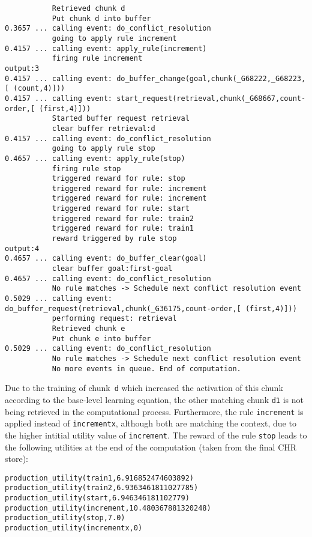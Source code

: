 \begin{lstlisting}
           Retrieved chunk d
           Put chunk d into buffer
0.3657 ... calling event: do_conflict_resolution
           going to apply rule increment
0.4157 ... calling event: apply_rule(increment)
           firing rule increment
output:3
0.4157 ... calling event: do_buffer_change(goal,chunk(_G68222,_G68223,[ (count,4)]))
0.4157 ... calling event: start_request(retrieval,chunk(_G68667,count-order,[ (first,4)]))
           Started buffer request retrieval
           clear buffer retrieval:d
0.4157 ... calling event: do_conflict_resolution
           going to apply rule stop
0.4657 ... calling event: apply_rule(stop)
           firing rule stop
           triggered reward for rule: stop
           triggered reward for rule: increment
           triggered reward for rule: increment
           triggered reward for rule: start
           triggered reward for rule: train2
           triggered reward for rule: train1
           reward triggered by rule stop
output:4
0.4657 ... calling event: do_buffer_clear(goal)
           clear buffer goal:first-goal
0.4657 ... calling event: do_conflict_resolution
           No rule matches -> Schedule next conflict resolution event
0.5029 ... calling event: do_buffer_request(retrieval,chunk(_G36175,count-order,[ (first,4)]))
           performing request: retrieval
           Retrieved chunk e
           Put chunk e into buffer
0.5029 ... calling event: do_conflict_resolution
           No rule matches -> Schedule next conflict resolution event
           No more events in queue. End of computation.
\end{lstlisting}
\flushbottom

Due to the training of chunk~\lstinline|d| which increased the activation of this chunk according to the base-level learning equation, the other matching chunk \lstinline|d1| is not being retrieved in the computational process. Furthermore, the rule \lstinline|increment| is applied instead of \lstinline|incrementx|, although both are matching the context, due to the higher intitial utility value of \lstinline|increment|. The reward of the rule \lstinline|stop| leads to the following utilities at the end of the computation (taken from the final CHR store):

\begin{lstlisting}
production_utility(train1,6.916852474603892)
production_utility(train2,6.9363461811027785)
production_utility(start,6.946346181102779)
production_utility(increment,10.480367881320248)
production_utility(stop,7.0)
production_utility(incrementx,0)
\end{lstlisting}

